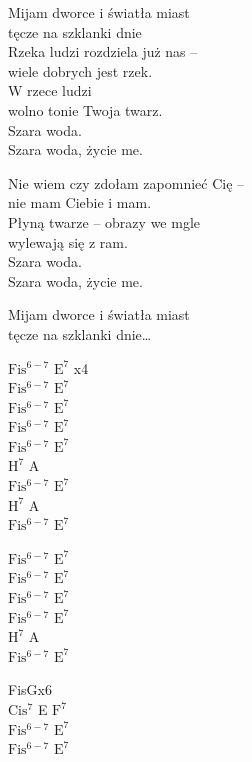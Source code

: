 \begin{text}
    \hfill\break
    Mijam dworce i światła miast\\
    tęcze na szklanki dnie\\
    Rzeka ludzi rozdziela już nas –\\
    wiele dobrych jest rzek.\\
    W rzece ludzi\\
    wolno tonie Twoja twarz.\\
    Szara woda.\\
    Szara woda, życie me.

    Nie wiem czy zdołam zapomnieć Cię –\\
    nie mam Ciebie i mam.\\
    Płyną twarze – obrazy we mgle\\
    wylewają się z ram.\\
    Szara woda.\\
    Szara woda, życie me.

    \hfill\break
    \hfill\break
    Mijam dworce i światła miast\\
    tęcze na szklanki dnie…
\end{text}
\begin{chord}
    $\mathrm{Fis^{6-7}}$ $\mathrm{E^7}$ x4\\
    $\mathrm{Fis^{6-7}}$ $\mathrm{E^7}$\\
    $\mathrm{Fis^{6-7}}$ $\mathrm{E^7}$\\
    $\mathrm{Fis^{6-7}}$ $\mathrm{E^7}$\\
    $\mathrm{Fis^{6-7}}$ $\mathrm{E^7}$\\
    $\mathrm{H^7}$ A\\
    $\mathrm{Fis^{6-7}}$ $\mathrm{E^7}$\\
    $\mathrm{H^7}$ A\\
    $\mathrm{Fis^{6-7}}$ $\mathrm{E^7}$

    $\mathrm{Fis^{6-7}}$ $\mathrm{E^7}$\\
    $\mathrm{Fis^{6-7}}$ $\mathrm{E^7}$\\
    $\mathrm{Fis^{6-7}}$ $\mathrm{E^7}$\\
    $\mathrm{Fis^{6-7}}$ $\mathrm{E^7}$\\
    $\mathrm{H^7}$ A\\
    $\mathrm{Fis^{6-7}}$ $\mathrm{E^7}$

    FisGx6\\
    $\mathrm{Cis^7}$ E $\mathrm{F^7}$\\
    $\mathrm{Fis^{6-7}}$ $\mathrm{E^7}$\\
    $\mathrm{Fis^{6-7}}$ $\mathrm{E^7}$
\end{chord}
